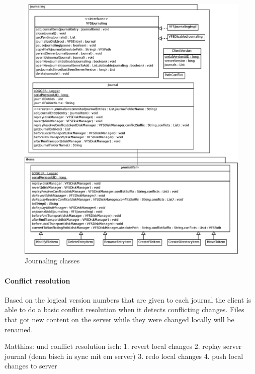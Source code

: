 \begin{figure}[h!]
\centering
\includegraphics[width=1\textwidth]{figures/22Journaling.eps}
\caption{Journaling classes}
\label{fig:journaling_classes}
\end{figure}

\paragraph{Conflict resolution}
Based on the logical version numbers that are given to each journal the client
is able to do a basic conflict resolution when it detects conflicting changes.
Files that got new content on the server while they were changed locally will be
renamed.

 Matthias:  und conflict resolution isch:
1. revert local changes
2. replay server journal (denn bisch in sync mit em server)
3. redo local changes
4. push local changes to server